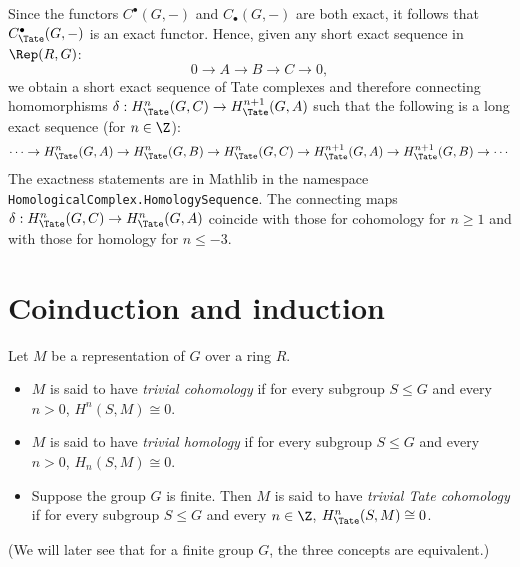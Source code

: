 \begin{definition}	\label{def:Tate long exact sequence}
	\leanok
  Since the functors $C^\bullet(G,-)$ and $C_\bullet(G,-)$ are both exact, it follows
	that $C^\bullet_{\Tate}(G,-)$ is an exact functor.
	Hence, given any short exact sequence in $\Rep(R,G)$:
	\[
		0 \to A \to B \to C \to 0,
	\]
	we obtain a short exact sequence of Tate complexes and therefore
	connecting homomorphisms $\delta : H^n_{\Tate}(G,C) \to H^{n+1}_{\Tate}(G,A)$
	such that the following is a long exact sequence (for $n \in \Z$):
	\[
		\cdots \to H^n_{\Tate}(G,A) \to H^n_{\Tate}(G,B) \to H^n_{\Tate}(G,C)
		\to H^{n+1}_{\Tate}(G,A) \to H^{n+1}_{\Tate}(G,B) \to \cdots
	\]
	The exactness statements are in Mathlib in the namespace
	\texttt{HomologicalComplex.HomologySequence}.
	The connecting maps $\delta : H^n_{\Tate}(G,C) \to H^n_{\Tate}(G,A)$
	coincide with those for cohomology for $n \ge 1$ and with those for homology for $n \le -3$.
\end{definition}





\section{Coinduction and induction}


\begin{definition} \label{def:trivial cohomology}
	\leanok
	Let $M$ be a representation of $G$ over a ring $R$.
	\begin{itemize}
		\item
		$M$ is said to have \emph{trivial cohomology} if for every subgroup $S \le G$
		and every $n > 0$, $H^n(S,M) \cong 0$.
		\item
		$M$ is said to have \emph{trivial homology} if for every subgroup $S \le G$
		and every $n > 0$, $H_n(S,M) \cong 0$.
		\item
		Suppose the group $G$ is finite. Then $M$ is said to have \emph{trivial Tate cohomology}
		if for every subgroup $S \le G$
		and every $n \in \Z$, $H^n_{\Tate}(S,M) \cong 0$.
	\end{itemize}
	(We will later see that for a finite group $G$, the three concepts are equivalent.)
\end{definition}

